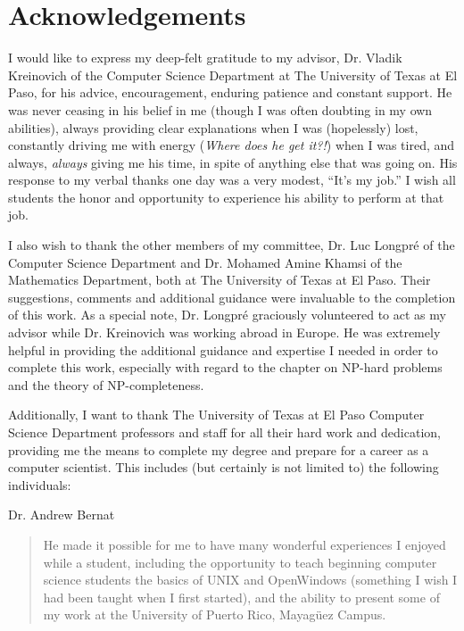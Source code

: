 
\chapter*{Acknowledgements}

I would like to express my deep-felt gratitude to my advisor, Dr. Vladik 
Kreinovich of the Computer Science Department at The University of Texas at El
Paso, for his advice, encouragement, enduring patience and constant support.
He was never ceasing in his belief in me (though I was often doubting in my 
own abilities), always providing clear explanations when I was (hopelessly) 
lost, constantly driving me with energy ({\it Where does he get it?!\/}) when 
I was tired, and always, {\em always\/} giving me his time, in spite of 
anything else that was going on.  His response to my verbal thanks one day was 
a very modest, ``It's my job.''  I wish all students the honor and opportunity 
to experience his ability to perform at that job.

I also wish to thank the other members of my committee, Dr. Luc Longpr\'{e} of 
the Computer Science Department and Dr. Mohamed Amine Khamsi of the Mathematics 
Department, both at The University of Texas at El Paso.  Their suggestions, 
comments and additional guidance were invaluable to the completion of this work.
As a special note, Dr. Longpr\'{e} graciously volunteered to act as my advisor
while Dr. Kreinovich was working abroad in Europe.  He was extremely helpful in 
providing the additional guidance and expertise I needed in order to complete 
this work, especially with regard to the chapter on NP-hard problems and the 
theory of NP-completeness.

\newpage
Additionally, I want to thank The University of Texas at El Paso Computer 
Science Department professors and staff for all their hard work and dedication,
providing me the means to complete my degree and prepare for a career as a 
computer scientist. This includes (but certainly is not limited to) the 
following individuals:

\bigskip

\noindent
Dr. Andrew Bernat
\begin{quote}
  He made it possible for me to have many wonderful experiences I enjoyed 
  while a student, including the opportunity to teach beginning computer 
  science students the basics of UNIX and OpenWindows (something I wish I 
  had been taught when I first started), and the ability to present some 
  of my work at the University of Puerto Rico, Mayag\"{u}ez Campus.
\end{quote}

